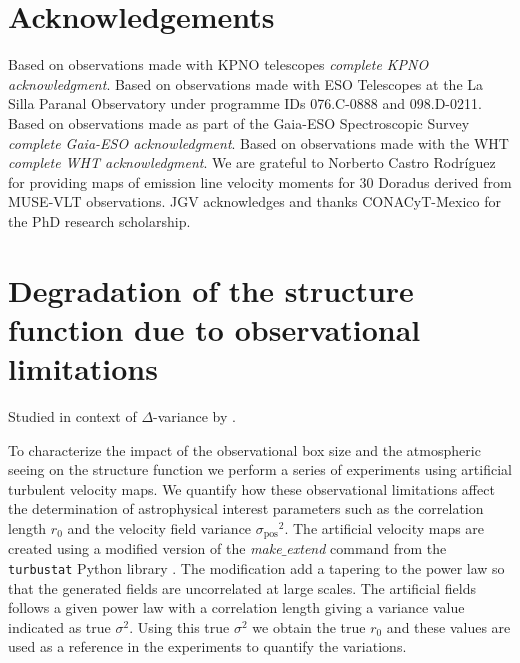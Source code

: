 \documentclass[fleqn,usenatbib, useAMS, a4paper]{mnras}
\newcommand\pos{\ensuremath{_{\mathrm{pos}}}}
\begin{document}

\section*{Acknowledgements}

Based on observations made with KPNO telescopes
\textit{complete KPNO acknowledgment}.
Based on observations made with ESO Telescopes at the La Silla Paranal Observatory under programme IDs 076.C-0888 and 098.D-0211.
Based on observations made as part of the Gaia-ESO Spectroscopic Survey
\textit{complete Gaia-ESO acknowledgment}.
Based on observations made with the WHT
\textit{complete WHT acknowledgment}.
We are grateful to Norberto Castro Rodríguez for providing maps of emission line velocity moments for 30 Doradus derived from MUSE-VLT observations.
JGV acknowledges and thanks CONACyT-Mexico for the PhD research scholarship.







\appendix

\section{Degradation of the structure function due to observational limitations}
\label{sec:degr-struct-funct}
Studied in context of \(\Delta\)-variance by \citet{Bensch:2001l}.

To characterize the impact of the observational box size and the atmospheric seeing on the structure function we perform a series of experiments using artificial turbulent velocity maps.
We quantify how these observational limitations affect the determination of astrophysical interest parameters such as the correlation length \(r_0\) and the velocity field variance \(\sigma\pos^2 \). 
The artificial velocity maps are created using a modified version of the \textit{make$\_$extend} command from the \texttt{turbustat} Python library \citep{Koch2019AJ....158....1K}.
The modification add a tapering to the power law so that the generated fields are uncorrelated at large scales.
The artificial fields follows a given power law with a correlation length giving a variance value indicated as true \(\sigma^2\).
Using this true \(\sigma^2\) we obtain the true \(r_0\) and these values are used as a reference in the experiments to quantify the variations.
\end{document}
